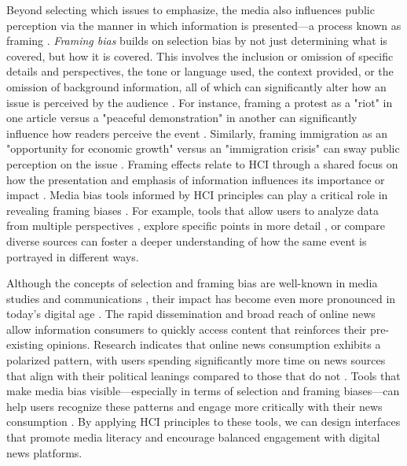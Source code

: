 Beyond selecting which issues to emphasize, the media also influences public perception via the manner in which information is presented---a process known as framing \cite{weaver2007thoughts}. \emph{Framing bias} builds on selection bias by not just determining what is covered, but how it is covered. This involves the inclusion or omission of specific details and perspectives, the tone or language used, the context provided, or the omission of background information, all of which can significantly alter how an issue is perceived by the audience \cite{entman1993framing,gentzkow2006media, chong2007framing}. For instance, framing a protest as a "riot" in one article versus a "peaceful demonstration" in another can significantly influence how readers perceive the event \cite{brown_protest_2021, susanszky2022media}. Similarly, framing immigration as an "opportunity for economic growth" versus an "immigration crisis" can sway public perception on the issue \cite{Igartua2009ModeratingEO}. Framing effects relate to HCI through a shared focus on how the presentation and emphasis of information influences its importance or impact \cite{hartmann_framing}. Media bias tools informed by HCI principles can play a critical role in revealing framing biases \cite{dingler_workshop}. For example, tools that allow users to analyze data from multiple perspectives \cite{ainsworth2008educational}, explore specific points in more detail \cite{springer2019progressive}, or compare diverse sources \cite{bhuiyan2023newscomp,braaten2011measuring} can foster a deeper understanding of how the same event is portrayed in different ways.

Although the concepts of selection and framing bias are well-known in media studies and communications \cite{o2009news, d2000media, matthes2009s}, their impact has become even more pronounced in today's digital age \cite{harcup2017news, bourgeois2018selection}. The rapid dissemination and broad reach of online news allow information consumers to quickly access content that reinforces their pre-existing opinions. Research indicates that online news consumption exhibits a polarized pattern, with users spending significantly more time on news sources that align with their political leanings compared to those that do not \cite{garimella2021political}. Tools that make media bias visible---especially in terms of selection and framing biases---can help users recognize these patterns and engage more critically with their news consumption \cite{markus}. By applying HCI principles to these tools, we can design interfaces that promote media literacy and encourage balanced engagement with digital news platforms.

